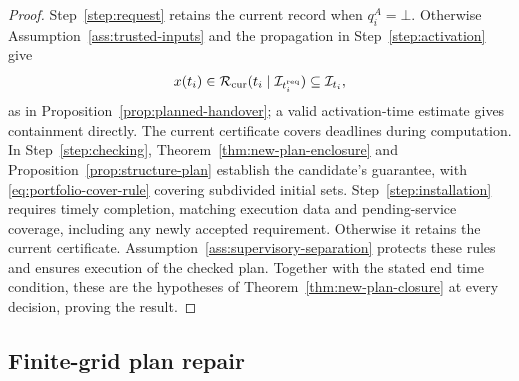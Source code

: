 \documentclass[final]{cas-sc}
\theoremstyle{definition}
\theoremstyle{plain}
\theoremstyle{definition}
\theoremstyle{plain}
\begin{document}
\begin{proof}
Step~\ref{step:request} retains the current record when
$q_i^{A}=\bot$. Otherwise Assumption~\ref{ass:trusted-inputs} and the
propagation in Step~\ref{step:activation} give
\[
x(t_i)\in\mathcal R_{\rm cur}(t_i\mid\mathcal I_{t_i^{\rm req}})
\subseteq\mathcal I_{t_i},
\]
as in Proposition~\ref{prop:planned-handover}; a valid activation-time estimate
gives containment directly. The current certificate covers deadlines
during computation. In Step~\ref{step:checking},
Theorem~\ref{thm:new-plan-enclosure} and Proposition~\ref{prop:structure-plan} establish
the candidate's guarantee, with \eqref{eq:portfolio-cover-rule} covering
subdivided initial sets. Step~\ref{step:installation} requires timely
completion, matching execution data and pending-service coverage,
including any newly accepted requirement. Otherwise it retains the
current certificate. Assumption~\ref{ass:supervisory-separation} protects these
rules and ensures execution of the checked plan. Together with the
stated end time condition, these are the hypotheses of
Theorem~\ref{thm:new-plan-closure} at every decision, proving the result.
\end{proof}

\subsection{Finite-grid plan repair}
\label{sec:predictive-repair}
\end{document}
